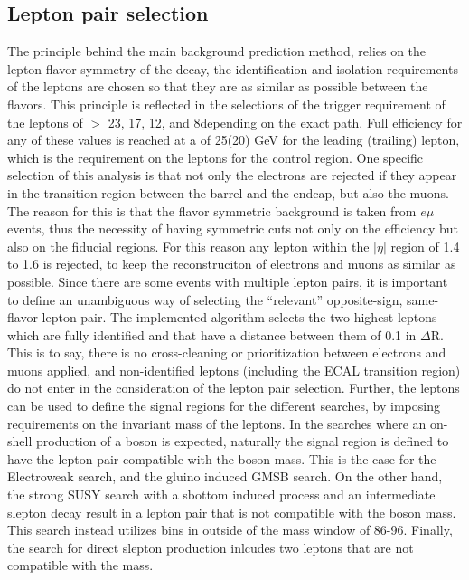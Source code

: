 \subsection{Lepton pair selection}
The principle behind the main background prediction method, relies on the lepton flavor symmetry of the \PW decay, the identification and isolation requirements of the leptons are chosen so that they are as similar as possible between the flavors. 
This principle is reflected in the selections of the trigger requirement of the leptons of \pt $>$ 23, 17, 12, and 8\GeV depending on the exact path. 
Full efficiency for any of these values is reached at a \pt of 25(20) GeV for the leading (trailing) lepton, which is the requirement on the leptons for the control region. 
One specific selection of this analysis is that not only the electrons are rejected if they appear in the transition region between the barrel and the endcap, but also the muons. 
The reason for this is that the flavor symmetric background is taken from $e\mu$ events, thus the necessity of having symmetric cuts not only on the efficiency but also on the fiducial regions. 
For this reason any lepton within the $|\eta|$ region of 1.4 to 1.6 is rejected, to keep the reconstruciton of electrons and muons as similar as possible. 
Since there are some events with multiple lepton pairs, it is important to define an unambiguous way of selecting the ``relevant''  opposite-sign, same-flavor lepton pair. 
The implemented algorithm selects the two highest \pt leptons which are fully identified and that have a distance between them of 0.1 in $\Delta$R. 
This is to say, there is no cross-cleaning or prioritization between electrons and muons applied, and non-identified leptons (including the ECAL transition region) do not enter in the consideration of the lepton pair selection. 
Further, the leptons can be used to define the signal regions for the different searches, by imposing requirements on the invariant mass of the leptons. 
In the searches where an on-shell production of a \PZ boson is expected, naturally the signal region is defined to have the lepton pair compatible with the \PZ boson mass.  
This is the case for the Electroweak search, and the gluino induced GMSB search. 
On the other hand, the strong SUSY search with a sbottom induced process and an intermediate slepton decay result in a lepton pair that is not compatible with the \PZ boson mass. 
This search instead utilizes bins in \mll outside of the \PZ mass window of 86-96\GeV. 
Finally, the search for direct slepton production inlcudes two leptons that are not compatible with the \PZ mass. 
